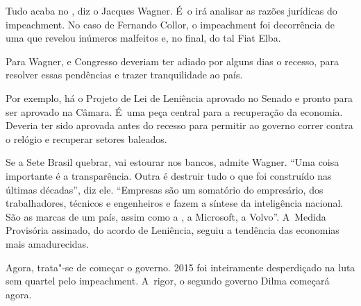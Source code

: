 Tudo acaba no , diz o Jacques Wagner. É~o  irá analisar as razões
jurídicas do impeachment. No caso de Fernando Collor, o impeachment foi
decorrência de uma  que revelou inúmeros malfeitos e, no final, do
tal Fiat Elba.

\asterisc{}

Para Wagner,  e Congresso deveriam ter adiado por alguns dias o
recesso, para resolver essas pendências e trazer tranquilidade ao país.

Por exemplo, há o Projeto de Lei de Leniência aprovado no Senado e
pronto para ser aprovado na Câmara. É~uma peça central para a
recuperação da economia. Deveria ter sido aprovada antes do recesso para
permitir ao governo correr contra o relógio e recuperar setores
baleados.

Se a Sete Brasil quebrar, vai estourar nos bancos, admite Wagner. ``Uma
coisa importante é a transparência. Outra é destruir tudo o que foi
construído nas últimas décadas'', diz ele. ``Empresas são um somatório
do empresário, dos trabalhadores, técnicos e engenheiros e fazem a
síntese da inteligência nacional. São as marcas de um país, assim como a
, a Microsoft, a Volvo''. A~Medida Provisória assinado, do acordo de
Leniência, seguiu a tendência das economias mais amadurecidas.

\asterisc{}

Agora, trata"-se de começar o governo. 2015 foi inteiramente desperdiçado
na luta sem quartel pelo impeachment. A~rigor, o segundo governo Dilma
começará agora.
